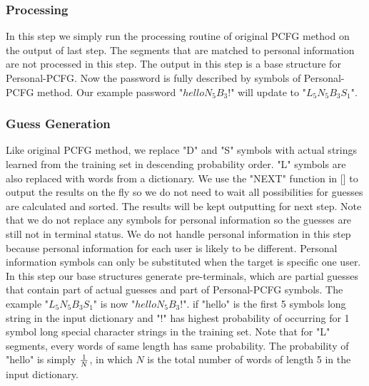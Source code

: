 \documentclass{sig-alternate}
\begin{document}
\subsubsection{Processing}
In this step we simply run the processing routine of original PCFG method on the output of last step. The segments that are matched to personal information are not processed in this step. The output in this step is a base structure for Personal-PCFG. Now the password is fully described by symbols of Personal-PCFG method. Our example password "$helloN_5B_3!$" will update to "$L_5N_5B_3S_1$". 
\subsubsection{Guess Generation}
Like original PCFG method, we replace "D" and "S" symbols with actual strings learned from the training set in descending probability order. "L" symbols are also replaced with words from a dictionary. We use the "NEXT" function in [] to output the results on the fly so we do not need to wait all possibilities for guesses are calculated and sorted. The results will be kept outputting for next step. Note that we do not replace any symbols for personal information so the guesses are still not in terminal status. We do not handle personal information in this step because personal information for each user is likely to be different. Personal information symbols can only be substituted when the target is specific one user. In this step our base structures generate pre-terminals, which are partial guesses that contain part of actual guesses and part of Personal-PCFG symbols. The example "$L_5N_5B_3S_1$" is now "$helloN_5B_3!$". if "hello" is the first 5 symbols long string in the input dictionary and "!" has highest probability of occurring for 1 symbol long special character strings in the training set. Note that for "L" segments, every words of same length has same probability. The probability of "hello" is simply $1\over N$, in which $N$ is the total number of words of length 5 in the input dictionary. 
\end{document}
